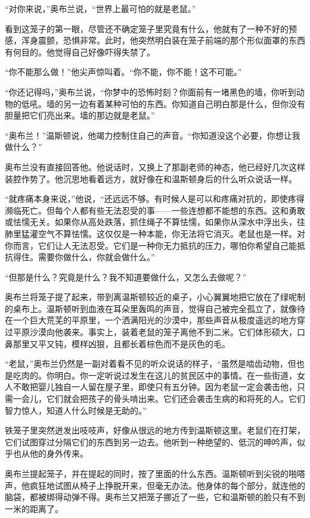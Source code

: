 ``对你来说，''奥布兰说，``世界上最可怕的就是老鼠。''

看到这笼子的第一眼，尽管还不确定笼子里究竟有什么，他就有了一种不好的预感，浑身震颤，恐惧非常。此时，他突然明白装在笼子前端的那个形似面罩的东西有何目的。他觉得自己好像吓得失禁了。

``你不能那么做！''他尖声惊叫着。``你不能，你不能！这不可能。''

``你还记得吗，''奥布兰说，``你梦中的恐怖时刻？你面前有一堵黑色的墙，你听到动物的低吼。墙的另一边有着某种可怕的东西。你知道自己明白那是什么，但你没有胆量把它们亮出来。墙的那边就是老鼠。''

``奥布兰！''温斯顿说，他竭力控制住自己的声音。``你知道没这个必要，你想让我做什么？''

奥布兰没有直接回答他。他说话时，又换上了那副老师的神态，他已经好几次这样装腔作势了。他沉思地看着远方，就好像在和温斯顿身后的什么听众说话一样。

``就疼痛本身来说，''他说，``还远远不够。有时候人是可以和疼痛对抗的，即使疼得濒临死亡。但每个人都有些无法忍受的事——一些连想都不能想的东西。这和勇敢或怯懦无关。如果你从高处跌落，抓住绳子不算怯懦，如果你从深水中浮出头，往肺里猛灌空气不算怯懦。这仅仅是一种本能，你无法将它消灭。老鼠也是一样。对你而言，它们让人无法忍受。它们是一种你无力抵抗的压力，哪怕你希望自己能抵抗得住。需要你做什么，你就会做什么。''

``但那是什么？究竟是什么？我不知道要做什么，又怎么去做呢？''

奥布兰将笼子提了起来，带到离温斯顿较近的桌子，小心翼翼地把它放在了绿呢制的桌布上。温斯顿听到血液在耳朵里轰鸣的声音，觉得自己被完全孤立了，就像待在一个巨大荒芜的平原里，一个洒满阳光的沙漠中，那些声音从极度遥远的地方穿过平原沙漠向他袭来。事实上，装着老鼠的笼子离他不到二米。它们体形硕大，口鼻那里又平又钝，模样凶狠，且都长着棕色而不是灰色的毛。

``老鼠，''奥布兰仍然是一副对着看不见的听众说话的样子，``虽然是啮齿动物，但也是吃肉的。你明白。你一定听说过发生在这儿的贫民区中的事情。在一些街道，女人不敢把婴儿独自一人留在屋子里，即使只有五分钟。因为老鼠一定会袭击他，只需一会儿，它们就会把孩子的骨头啃出来。它们还会袭击生病的和将死的人。它们智力惊人，知道人什么时候是无助的。''

铁笼子里突然迸发出吱吱声，好像从很远的地方传到温斯顿这里。老鼠们在打架，它们试图穿过分隔它们的东西到另一边去。他听到一种绝望的、低沉的呻吟声，似乎也从他的身外传来。

奥布兰提起笼子，并在提起的同时，按了里面的什么东西。温斯顿听到尖锐的啪嗒声，他疯狂地试图从椅子上挣脱开来，但毫无办法。他身体的每个部分，就连他的脑袋，都被绑得动弹不得。奥布兰又把笼子挪近了一些，它和温斯顿的脸只有不到一米的距离了。

